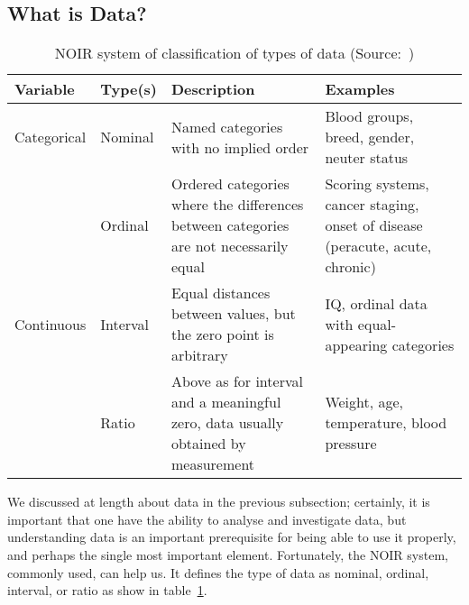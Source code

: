 \subsection{What is Data?}
\begin{table}[ht]
    \begin{tabularx}{\textwidth}{
            | >{\raggedright\arraybackslash} l
            | >{\raggedright\arraybackslash} l
            | >{\raggedright\arraybackslash} X
            | >{\raggedright\arraybackslash} X |}
        \toprule
        \hfil\bfseries Variable & \hfil\bfseries Type(s) & \hfil\bfseries Description                                                            & \hfil\bfseries Examples                                                      \\
        \midrule
        Categorical             & Nominal                & Named categories with no implied order                                                & Blood groups, breed, gender, neuter status                                   \\
        ~                       & Ordinal                & Ordered categories where the differences between categories are not necessarily equal & Scoring systems, cancer staging, onset of disease (peracute, acute, chronic) \\
        \midrule
        Continuous              & Interval               & Equal distances between values, but the zero point is arbitrary                        & IQ, ordinal data with equal-appearing categories                             \\
        ~                       & Ratio                  & Above as for interval and a meaningful zero, data usually obtained by measurement     & Weight, age, temperature, blood pressure                                     \\
        \bottomrule
    \end{tabularx}
    \caption{NOIR system of classification of types of data (Source:~\cite{Article:intro_to_data_analysis})}
    \label{table:noir_sys}
\end{table}
We discussed at length about data in the previous subsection; certainly, it is important that one have the ability to analyse and investigate data, but 
understanding data is an important prerequisite for being able to use it properly, and perhaps the single most important element.
Fortunately, the NOIR system, commonly used, can help us. It defines the type of data as nominal, ordinal, interval, or ratio as show in table~\ref{table:noir_sys}.

